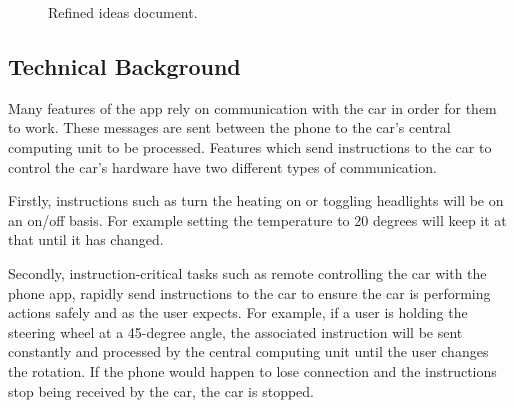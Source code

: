 \documentclass{article}
\begin{document}
\begin{figure}[H]
  \centering
  \caption{Refined ideas document.}\label{refined-ideas}
\end{figure}

\subsection{Technical Background}\label{ssec:app-tech} %
Many features of the app rely on communication with the car in order for them to work. These messages are sent between the phone to the car's central computing unit to be processed. Features which send instructions to the car to control the car's hardware have two different types of communication.

Firstly, instructions such as turn the heating on or toggling headlights will be on an on/off basis. For example setting the temperature to 20 degrees will keep it at that until it has changed.

Secondly, instruction-critical tasks such as remote controlling the car with the phone app, rapidly send instructions to the car to ensure the car is performing actions safely and as the user expects. For example, if a user is holding the steering wheel at a 45-degree angle, the associated instruction will be sent constantly and processed by the central computing unit until the user changes the rotation. If the phone would happen to lose connection and the instructions stop being received by the car, the car is stopped.
\end{document}
